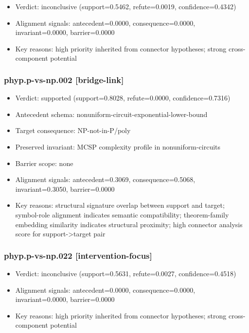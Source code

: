 \documentclass[
]{article}
\newcounter{none} %
\providecommand{\tightlist}{%
  \setlength{\itemsep}{0pt}\setlength{\parskip}{0pt}}
\begin{document}
\begin{itemize}
\tightlist
\item
  Verdict: inconclusive (support=0.5462, refute=0.0019,
  confidence=0.4342)
\item
  Alignment signals: antecedent=0.0000, consequence=0.0000,
  invariant=0.0000, barrier=0.0000
\item
  Key reasons: high priority inherited from connector hypotheses; strong
  cross-component potential
\end{itemize}

\subsubsection{phyp.p-vs-np.002
{[}bridge-link{]}}\label{phypp-vs-np002-bridge-link}

\begin{itemize}
\tightlist
\item
  Verdict: supported (support=0.8028, refute=0.0000, confidence=0.7316)
\item
  Antecedent schema: nonuniform-circuit-exponential-lower-bound
\item
  Target consequence: NP-not-in-P/poly
\item
  Preserved invariant: MCSP complexity profile in nonuniform-circuits
\item
  Barrier scope: none
\item
  Alignment signals: antecedent=0.3069, consequence=0.5068,
  invariant=0.3050, barrier=0.0000
\item
  Key reasons: structural signature overlap between support and target;
  symbol-role alignment indicates semantic compatibility; theorem-family
  embedding similarity indicates structural proximity; high connector
  analysis score for support-\textgreater target pair
\end{itemize}

\subsubsection{phyp.p-vs-np.022
{[}intervention-focus{]}}\label{phypp-vs-np022-intervention-focus}

\begin{itemize}
\tightlist
\item
  Verdict: inconclusive (support=0.5631, refute=0.0027,
  confidence=0.4518)
\item
  Alignment signals: antecedent=0.0000, consequence=0.0000,
  invariant=0.0000, barrier=0.0000
\item
  Key reasons: high priority inherited from connector hypotheses; strong
  cross-component potential
\end{itemize}
\end{document}
